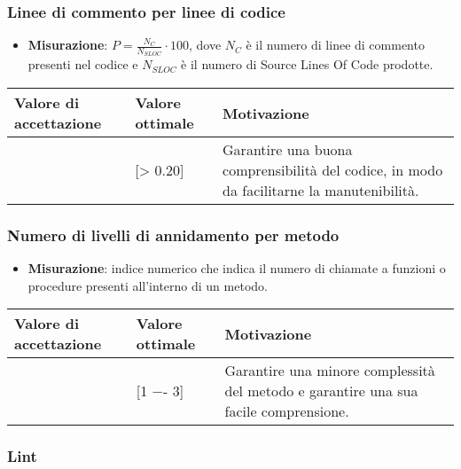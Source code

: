 \subsubsection{Linee di commento per linee di codice}

\begin{itemize}
\item \textbf{Misurazione}: $P=\frac{N_{C}}{N_{SLOC}} \cdot 100$, dove $N_{C}$ è il numero di linee di commento presenti nel codice e $N_{SLOC}$ è il numero di Source Lines Of Code prodotte.
\end{itemize}

\begin{center}
		\begin{tabular}{|P{2.5cm}|P{2.5cm}|P{6cm}|}
		\hline
			\textbf{Valore di accettazione}	& \textbf{Valore ottimale} & \textbf{Motivazione} \\
			\hline
			[> 0.15] & [> 0.20] &	Garantire una buona comprensibilità del codice, in modo da facilitarne la manutenibilità. \\
			\hline
			\end{tabular}
\end{center}

\subsubsection{Numero di livelli di annidamento per metodo}

\begin{itemize}
\item \textbf{Misurazione}: indice numerico che indica il numero di chiamate a funzioni o procedure presenti all'interno di un metodo.
\end{itemize}

\begin{center}
		\begin{tabular}{|P{2.5cm}|P{2.5cm}|P{6cm}|}
		\hline
			\textbf{Valore di accettazione}	& \textbf{Valore ottimale} & \textbf{Motivazione} \\
			\hline
			[1 -- 5] & [1 −- 3] &	Garantire una minore complessità del metodo e garantire una sua facile comprensione. \\
			\hline
			\end{tabular}
\end{center}


\subsubsection{Lint}

